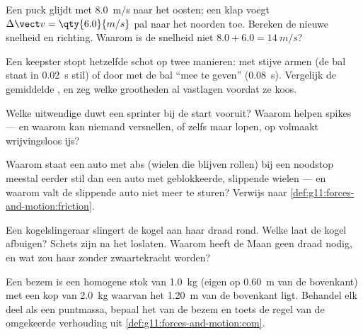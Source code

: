 \begin{exercise}[$\star\star$]\label{exo:g11:forces-and-motion:7}
Een puck glijdt met \qty{8.0}{m/s} naar het oosten; een klap voegt
$\Delta \vect v = \qty{6.0}{m/s}$ pal naar het noorden toe. Bereken de
nieuwe snelheid en richting. Waarom is de snelheid niet
$8.0 + 6.0 = \qty{14}{m/s}$?
\end{exercise}

\begin{exercise}[$\star\star$]\label{exo:g11:forces-and-motion:8}
Een keepster stopt hetzelfde schot op twee manieren: met stijve armen (de
bal staat in \qty{0.02}{s} stil) of door met de bal ``mee te geven''
(\qty{0.08}{s}). Vergelijk de gemiddelde , en zeg welke
grootheden al vastlagen voordat ze koos.
\end{exercise}

\begin{exercise}[$\star\star$]\label{exo:g11:forces-and-motion:9}
Welke uitwendige  duwt een sprinter bij de start vooruit? Waarom
helpen spikes --- en waarom kan niemand versnellen, of zelfs maar lopen,
op volmaakt wrijvingsloos ijs?
\end{exercise}

\begin{exercise}[$\star\star$]\label{exo:g11:forces-and-motion:10}
Waarom staat een auto met abs (wielen die blijven rollen) bij een
noodstop meestal eerder stil dan een auto met geblokkeerde, slippende
wielen --- en waarom valt de slippende auto niet meer te sturen? Verwijs
naar \cref{def:g11:forces-and-motion:friction}.
\end{exercise}

\begin{exercise}[$\star\star$]\label{exo:g11:forces-and-motion:11}
Een kogelslingeraar slingert de kogel aan haar draad rond. Welke 
laat de kogel afbuigen? Schets zijn  na het loslaten. Waarom heeft de
Maan geen draad nodig, en wat zou haar  zonder zwaartekracht worden?
\end{exercise}

\begin{exercise}[$\star\star\star$]\label{exo:g11:forces-and-motion:12}
Een bezem is een homogene stok van \qty{1.0}{kg} (eigen 
op \qty{0.60}{m} van de bovenkant) met een kop van \qty{2.0}{kg} waarvan
het  \qty{1.20}{m} van de bovenkant ligt. Behandel elk
deel als een puntmassa, bepaal het  van de bezem en toets
de regel van de omgekeerde verhouding uit
\cref{def:g11:forces-and-motion:com}.
\end{exercise}

